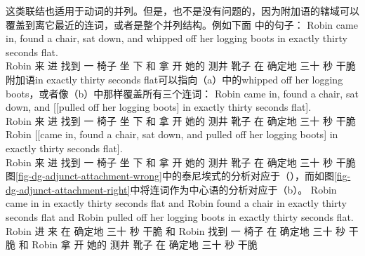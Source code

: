 这类联结也适用于动词的并列。但是，也不是没有问题的，因为附加语的辖域可以覆盖到离它最近的连词，或者是整个并列结构。例如下面 \citet[]{Levine2003a}中的句子：
\ea
\gll Robin came in, found a chair, sat down, and whipped off her logging boots in exactly thirty seconds flat.\\
Robin 来 进 找到 一 椅子 坐 下 和 拿 开 她的 测井 靴子 在 确定地 三十 秒 干脆\\
\z
附加语in exactly thirty seconds flat可以指向（a）中的whipped off her logging boots，或者像（b）中那样覆盖所有三个连词：
\eal
\ex 
\gll Robin came in, found a chair, sat down, and [[pulled off her logging boots] in exactly thirty seconds flat].\\
     Robin 来   进   找到  一 椅子    坐  下    和  \hspaceThis{[[}拿 开 她的 测井 靴子 在 确定地 三十 秒 干脆\\
\ex\label{ex-Robin-flat-VP}
\gll Robin [[came in, found a chair, sat down, and pulled off her logging boots] in exactly thirty seconds flat].\\
     Robin \hspaceThis{[[}来 进 找到 一 椅子 坐 下 和 拿 开 她的 测井 靴子 在 确定地 三十 秒 干脆\\
\zl
图\vref{fig-dg-adjunct-attachment-wrong}中的泰尼埃式的分析对应于（），而如图\vref{fig-dg-adjunct-attachment-right}中将连词作为中心语的分析对应于（b）。
\ea
\gll Robin came in in exactly thirty seconds flat and Robin found a chair in exactly thirty seconds flat
and Robin pulled off her logging boots in exactly thirty seconds flat.\\
Robin 进 来 在 确定地 三十 秒 干脆 和 Robin 找到 一 椅子 在 确定地 三十 秒 干脆 和 Robin 拿 开 她的 测井 靴子 在 确定地 三十 秒 干脆\\
